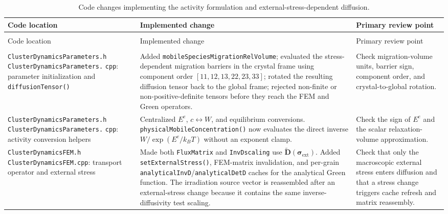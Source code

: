 \documentclass[10pt]{article}
\begin{document}
{\small
\begin{longtable}{|>{\raggedright\arraybackslash}p{}|>{\raggedright\arraybackslash}p{}|>{\raggedright\arraybackslash}p{}|}
\caption{Code changes implementing the activity formulation and
external-stress-dependent diffusion.}
\label{tab:code_changes}\\
\hline
Code location & Implemented change & Primary review point \\
\hline
\endfirsthead
\multicolumn{3}{c}{\tablename\ \thetable{} -- continued from previous page}\\
\hline
Code location & Implemented change & Primary review point \\
\hline
\endhead
\hline
\multicolumn{3}{r}{Continued on next page}\\
\endfoot
\hline
\endlastfoot

\texttt{ClusterDynamicsParameters.h}\newline
\texttt{ClusterDynamicsParameters.}\newline
\texttt{cpp}: parameter initialization and
\texttt{diffusionTensor()}
&
Added \texttt{mobileSpeciesMigrationRelVolume}; evaluated the
stress-dependent migration barriers in the crystal frame using component
order $[11,12,13,22,23,33]$; rotated the resulting diffusion tensor back to
the global frame; rejected non-finite or non-positive-definite tensors before
they reach the FEM and Green operators.
&
Check migration-volume units, barrier sign, component order, and
crystal-to-global rotation.
\\
\hline

\texttt{ClusterDynamicsParameters.h}\newline
\texttt{ClusterDynamicsParameters.}\newline
\texttt{cpp}: activity conversion helpers
&
Centralized $E^e$, $c\leftrightarrow W$, and equilibrium conversions.
\texttt{physicalMobileConcentration()} now evaluates the direct inverse
$W/\exp(E^e/k_BT)$ without an exponent clamp.
&
Check the sign of $E^e$ and the scalar relaxation-volume approximation.
\\
\hline

\texttt{ClusterDynamicsFEM.h}\newline
\texttt{ClusterDynamicsFEM.cpp}: transport operator and external stress
&
Made both \texttt{FluxMatrix} and \texttt{InvDscaling} use
$\widetilde{\bm D}(\bm\sigma_{\mathrm{ext}})$.  Added
\texttt{setExternalStress()}, FEM-matrix invalidation, and per-grain
\texttt{analyticalInvD}/\texttt{analyticalDetD} caches for the analytical
Green function.  The irradiation source vector is reassembled after an
external-stress change because it contains the same inverse-diffusivity test
scaling.
&
Check that only the macroscopic external stress enters diffusion and that a
stress change triggers cache refresh and matrix reassembly.
\\
\hline


\end{longtable}}
\end{document}
